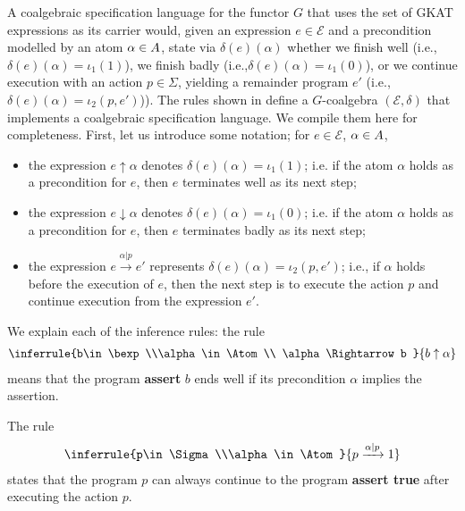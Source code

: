 A coalgebraic specification language for the functor $G$ that uses the set of GKAT expressions as its carrier would, given an expression $e\in \mathscr{E}$ and a precondition modelled by an atom $\alpha\in A$, state via $\delta(e)(\alpha)$ whether we finish well (i.e.,$\delta(e)(\alpha)=\iota_1(1)$), we finish badly (i.e.,$\delta(e)(\alpha)=\iota_1(0)$), or we continue execution with an action $p\in \Sigma$, yielding a remainder program $e'$ (i.e.,$\delta(e)(\alpha)=\iota_2(p,e')$)). The rules shown in \cite[Figure 2]{GKATCoequations} define a $G$-coalgebra $(\mathscr{E},\delta)$ that implements a coalgebraic specification language. We compile them here for completeness. First, let us introduce some notation; for $e\in \mathscr{E}$, $\alpha\in A$, 
\begin{itemize}
    \item the expression $e\uparrow \alpha $ denotes $\delta(e)(\alpha)=\iota_1(1)$; i.e. if the atom $\alpha$ holds as a precondition for $e$, then $e$ terminates well as its next step;
    \item the expression $e\downarrow \alpha$ denotes $\delta(e)(\alpha)=\iota_1(0)$; i.e. if the atom $\alpha$ holds as a precondition for $e$, then $e$ terminates badly as its next step;
    \item the expression $e\xrightarrow{\alpha|p}e'$ represents $\delta(e)(\alpha)=\iota_2(p,e')$; i.e., if $\alpha$ holds before the execution of $e$, then the next step is to execute the action $p$ and continue execution from the expression $e'$.
\end{itemize}
We explain each of the inference rules: the rule
\begin{align}
    \inferrule
    {b\in \bexp\\\alpha\in \Atom \\ \alpha \Rightarrow b }
    {b\uparrow \alpha}    
\end{align}
means that the program \textbf{assert} $b$ ends well if its precondition $\alpha$ implies the assertion. 

The rule
\begin{align}
    \inferrule
    {p\in \Sigma\\\alpha\in \Atom}
    {p\xrightarrow{\alpha|p} 1}    
\end{align}
states that the program $p$ can always continue to the program \textbf{assert true} after executing the action $p$. 

